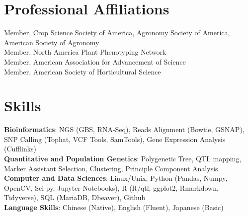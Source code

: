 \documentclass[11pt,a4paper,]{awesome-cv}
\begin{document}
\hypertarget{professional-affiliations}{%
\section{Professional Affiliations}\label{professional-affiliations}}

Member, Crop Science Society of America, Agronomy Society of America,
American Society of Agronomy\\
Member, North America Plant Phenotyping Network\\
Member, American Association for Advancement of Science\\
Member, American Society of Horticultural Science

\hypertarget{skills}{%
\section{Skills}\label{skills}}

\textbf{Bioinformatics}: NGS (GBS, RNA-Seq), Reads Alignment (Bowtie,
GSNAP), SNP Calling (Tophat, VCF Tools, SamTools), Gene Expression
Analysis (Cufflinks)\\
\textbf{Quantitative and Population Genetics}: Polygenetic Tree, QTL
mapping, Marker Assistant Selection, Clustering, Principle Component
Analysis\\
\textbf{Computer and Data Sciences}: Linux/Unix, Python (Pandas, Numpy,
OpenCV, Sci-py, Jupyter Notebooks), R (R/qtl, ggplot2, Rmarkdown,
Tidyverse), SQL (MariaDB, Dbeaver), Github\\
\textbf{Language Skills}: Chinese (Native), English (Fluent), Japanese
(Basic)
\end{document}
